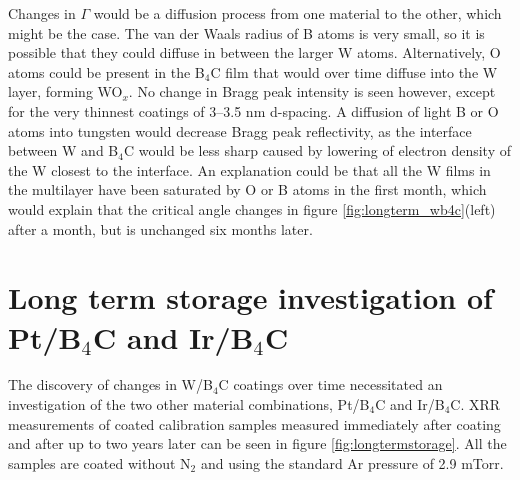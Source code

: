 Changes in $\Gamma$ would be a diffusion process from one material to the other, which might be the case. The van der Waals radius of B atoms is very small, so it is possible that they could diffuse in between the larger W atoms. Alternatively, O atoms could be present in the B$_4$C film that would over time diffuse into the W layer\cite{JACOBS:1963dp}, forming WO$_x$. No change in Bragg peak intensity is seen however, except for the very thinnest coatings of 3--3.5 nm d-spacing. A diffusion of light B or O atoms into tungsten would decrease Bragg peak reflectivity, as the interface between W and B$_4$C would be less sharp caused by lowering of electron density of the W closest to the interface. An explanation could be that all the W films in the multilayer have been saturated by O or B atoms in the first month, which would explain that the critical angle changes in figure \ref{fig:longterm_wb4c}(left) after a month, but is unchanged six months later.

\section{Long term storage investigation of Pt/B$_4$C and Ir/B$_4$C}\label{sec:long_term}
The discovery of changes in W/B$_4$C coatings over time necessitated an investigation of the two other material combinations, Pt/B$_4$C and Ir/B$_4$C. XRR measurements of coated calibration samples measured immediately after coating and after up to two years later can be seen in figure \ref{fig:longtermstorage}. All the samples are coated without N$_2$ and using the standard Ar pressure of 2.9 mTorr.

